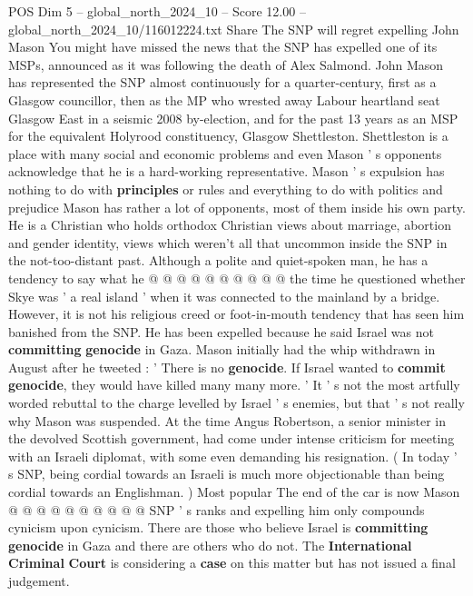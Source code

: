 \begin{textsample}{POS Dim 5 – global\_north\_2024\_10 – Score 12.00 – global\_north\_2024\_10/116012224.txt}  \label{ex:f5_pos_408}
Share The SNP will regret expelling John Mason You might have missed the news that the SNP has expelled one of its MSPs, announced as it was following the death of Alex Salmond.
John Mason has represented the SNP almost continuously for a quarter-century, first as a Glasgow councillor, then as the MP who wrested away Labour heartland seat Glasgow East in a seismic 2008 by-election, and for the past 13 years as an MSP for the equivalent Holyrood constituency, Glasgow Shettleston.
Shettleston is a place with many social and economic problems and even Mason ' s opponents acknowledge that he is a hard-working representative.
Mason ' s expulsion has nothing to do with \textbf{principles} or rules and everything to do with politics and prejudice Mason has rather a lot of opponents, most of them inside his own party.
He is a Christian who holds orthodox Christian views about marriage, abortion and gender identity, views which weren't all that uncommon inside the SNP in the not-too-distant past.
Although a polite and quiet-spoken man, he has a tendency to say what he @ @ @ @ @ @ @ @ @ @ the time he questioned whether Skye was ' a real island ' when it was connected to the mainland by a bridge.
However, it is not his religious creed or foot-in-mouth tendency that has seen him banished from the SNP.
He has been expelled because he said Israel was not \textbf{committing} \textbf{genocide} in Gaza.
Mason initially had the whip withdrawn in August after he tweeted : ' There is no \textbf{genocide}.
If Israel wanted to \textbf{commit} \textbf{genocide}, they would have killed many many more. ' It ' s not the most artfully worded rebuttal to the charge levelled by Israel ' s enemies, but that ' s not really why Mason was suspended.
At the time Angus Robertson, a senior minister in the devolved Scottish government, had come under intense criticism for meeting with an Israeli diplomat, with some even demanding his resignation. ( In today ' s SNP, being cordial towards an Israeli is much more objectionable than being cordial towards an Englishman. ) Most popular The end of the car is now Mason @ @ @ @ @ @ @ @ @ @ SNP ' s ranks and expelling him only compounds cynicism upon cynicism.
There are those who believe Israel is \textbf{committing} \textbf{genocide} in Gaza and there are others who do not.
The \textbf{International} \textbf{Criminal} \textbf{Court} is considering a \textbf{case} on this matter but has not issued a final judgement.

\end{textsample}
